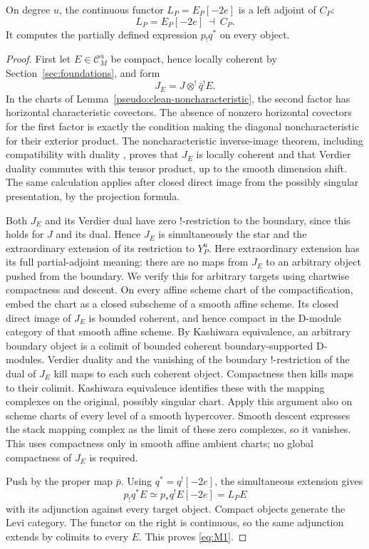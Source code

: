\begin{proposition}\label{pseudo:first-adjunction}
On degree $u$, the continuous functor $L_P=E_P[-2e]$ is a left adjoint of
$C_P$:
\begin{equation}\label{eq:M1}
 L_P=E_P[-2e]\ \dashv\ C_P.
\end{equation}
It computes the partially defined expression $p_!q^*$ on every object.
\end{proposition}

\begin{proof}
First let $E\in\mathcal C_M^u$ be compact, hence locally coherent by
Section~\ref{sec:foundations}, and form
\[
 J_E=J\otimes^!\bar q^!E.
\]
In the charts of Lemma~\ref{pseudo:clean-noncharacteristic}, the second
factor has horizontal characteristic covectors.  The absence of nonzero
horizontal covectors for the first factor is exactly the condition making
the diagonal noncharacteristic for their exterior product.  The
noncharacteristic inverse-image theorem, including compatibility with
duality \cite[Theorems~2.4.6 and~2.7.1(ii)]{HottaTakeuchiTanisaki}, proves that $J_E$ is
locally coherent and that Verdier duality commutes with this tensor product,
up to the smooth dimension shift.  The same calculation applies after
closed direct image from the possibly singular presentation, by the
projection formula.

Both $J_E$ and its Verdier dual have zero !-restriction to the boundary,
since this holds for $J$ and its dual.  Hence $J_E$ is simultaneously the
star and the extraordinary extension of its restriction to $Y_P^u$.
Here extraordinary extension has its full partial-adjoint meaning:
there are no maps from $J_E$ to an arbitrary object pushed from the
boundary.  We verify this for arbitrary targets using chartwise compactness
and descent.
On every affine scheme chart of the compactification, embed the chart as
a closed subscheme of a smooth affine scheme.  Its closed direct image
of $J_E$ is bounded coherent, and hence compact in the D-module category
of that smooth affine scheme.  By Kashiwara equivalence, an arbitrary
boundary object is a colimit of bounded coherent boundary-supported
D-modules.  Verdier duality and the vanishing of the boundary !-restriction
of the dual of $J_E$ kill maps to each such coherent object.  Compactness
then kills maps to their colimit.  Kashiwara equivalence identifies these
with the mapping complexes on the original, possibly singular chart.
Apply this argument also on scheme charts of every level of a smooth
hypercover.  Smooth descent expresses the stack mapping complex as the
limit of these zero complexes, so it vanishes.  This uses compactness only
in smooth affine ambient charts; no global compactness of $J_E$ is required.

Push by the proper map $\bar p$.  Using $q^*=q^![-2e]$, the simultaneous
extension gives
\[
 p_!q^*E\simeq p_*q^!E[-2e]=L_PE
\]
with its adjunction against every target object.  Compact objects generate
the Levi category.  The functor on the right is continuous, so the same
adjunction extends by colimits to every $E$.  This proves \eqref{eq:M1}.
\end{proof}

